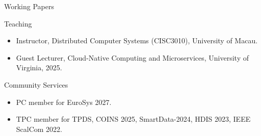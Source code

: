\documentclass{resume} %
\begin{document}
\begin{rSection}{Working Papers}


\begin{rSection}{Teaching}
\begin{itemize}
  \setlength{\itemsep}{0.2em}
 \setlength{\parskip}{0pt}
\item Instructor, Distributed Computer Systems (CISC3010), University of Macau.
\item Guest Lecturer, Cloud-Native Computing and Microservices, University of Virginia, 2025.
\end{itemize}
\end{rSection}
\vspace{-1em}

\begin{rSection}{Community Services}
\begin{itemize}
  \setlength{\itemsep}{0.2em}
 \setlength{\parskip}{0pt}
\item PC member for EuroSys 2027.
\item TPC member for TPDS, COINS 2025, SmartData-2024, HDIS 2023, IEEE ScalCom 2022.
\end{itemize}
\end{rSection}


\end{rSection}
\end{document}

